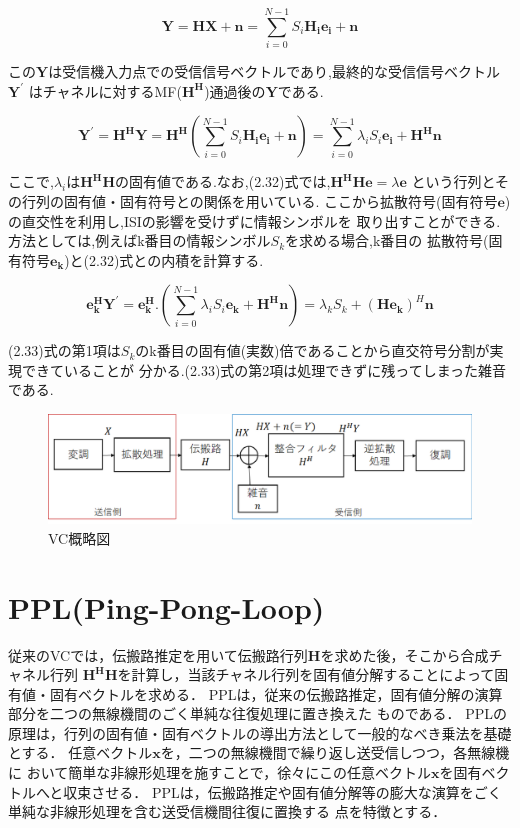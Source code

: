 \begin{equation}
    \bm{Y} = \bm{HX}+\bm{n} = \sum_{i=0}^{N-1} S_i\bm{H_ie_i}+\bm{n}
\end{equation}

この$\bm{Y}$は受信機入力点での受信信号ベクトルであり,最終的な受信信号ベクトル$\bm{Y^{\prime}}$
はチャネルに対するMF($\bm{H^H}$)通過後の$\bm{Y}$である.

\begin{equation}
    \bm{Y^{\prime}}=\bm{H^HY}=\bm{H^H}
    \left(
        \sum_{i=0}^{N-1} S_i\bm{H_ie_i}+\bm{n}
    \right)
    =\sum_{i=0}^{N-1} \lambda_iS_i\bm{e_i}+\bm{H^Hn}
\end{equation}

ここで,$\lambda_i$は$\bm{H^HH}$の固有値である.なお,(2.32)式では,$\bm{H^HHe}=\lambda\bm{e}$
という行列とその行列の固有値・固有符号との関係を用いている.
ここから拡散符号(固有符号$\bm{e}$)の直交性を利用し,ISIの影響を受けずに情報シンボルを
取り出すことができる.方法としては,例えばk番目の情報シンボル$S_k$を求める場合,k番目の
拡散符号(固有符号$\bm{e_k}$)と(2.32)式との内積を計算する.

\begin{equation}
    \bm{e_k^HY^{\prime}}=\bm{e_k^H}.
    \left(
        \sum_{i=0}^{N-1} \lambda_iS_i\bm{e_k}+\bm{H^Hn}
    \right)
    =\lambda_kS_k+(\bm{He_k})^H\bm{n}
\end{equation}

(2.33)式の第1項は$S_k$のk番目の固有値(実数)倍であることから直交符号分割が実現できていることが
分かる.(2.33)式の第2項は処理できずに残ってしまった雑音である.

\begin{figure}
    \centering
    \includegraphics[width=\linewidth]{chapter3/figure/VC.eps}
    \caption{VC概略図}
    \label{figVC}
\end{figure}

\section{PPL(Ping-Pong-Loop)}
従来のVCでは，伝搬路推定を用いて伝搬路行列$\bm{H}$を求めた後，そこから合成チャネル行列
$\bm{H^HH}$を計算し，当該チャネル行列を固有値分解することによって固有値・固有ベクトルを求める．
PPLは，従来の伝搬路推定，固有値分解の演算部分を二つの無線機間のごく単純な往復処理に置き換えた
ものである．
PPLの原理は，行列の固有値・固有ベクトルの導出方法として一般的なべき乗法を基礎とする．
任意ベクトル$\bm{x}$を，二つの無線機間で繰り返し送受信しつつ，各無線機に
おいて簡単な非線形処理を施すことで，徐々にこの任意ベクトル$\bm{x}$を固有ベクトルへと収束させる．
PPLは，伝搬路推定や固有値分解等の膨大な演算をごく単純な非線形処理を含む送受信機間往復に置換する
点を特徴とする．

